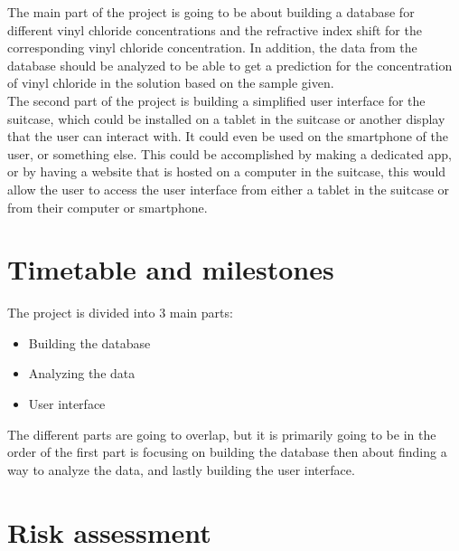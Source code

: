 \documentclass{article}
\begin{document}
The main part of the project is going to be about building a database for different vinyl chloride concentrations and the refractive index shift for the corresponding vinyl chloride concentration.
In addition, the data from the database should be analyzed to be able to get a prediction for the concentration of vinyl chloride in the solution based on the sample given.\\

The second part of the project is building a simplified user interface for the suitcase, which could be installed on a tablet in the suitcase or another display that the user can interact with.
It could even be used on the smartphone of the user, or something else.
This could be accomplished by making a dedicated app, or by having a website that is hosted on a computer in the suitcase, this would allow the user to access the user interface from either a tablet in the suitcase or from their computer or smartphone.\\

\vspace{15mm}
\section*{Timetable and milestones}
The project is divided into 3 main parts:\\
\begin{itemize}
    \item Building the database
    \item Analyzing the data
    \item User interface
\end{itemize}

The different parts are going to overlap, but it is primarily going to be in the order of the first part is focusing on building the database then about finding a way to analyze the data, and lastly building the user interface.


\vspace{15mm}
\section*{Risk assessment}

\vspace{15mm}
\printbibliography
\end{document}

